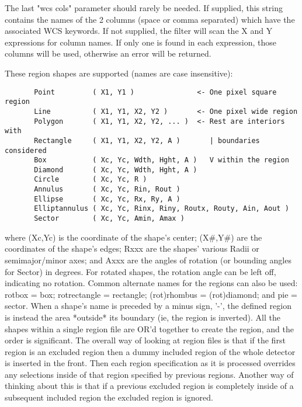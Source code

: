 \documentclass[11pt]{book}
\begin{document}
    The last "wcs cols" parameter should rarely be needed. If supplied,
    this  string contains the names of the 2 columns (space or comma
    separated) which have the associated WCS keywords. If not supplied,
    the filter  will scan the X  and Y expressions for column names.
    If only one is found in each  expression, those columns will be
    used, otherwise an error will be returned.

    These region shapes are supported (names are case insensitive):

\begin{verbatim}
       Point         ( X1, Y1 )               <- One pixel square region
       Line          ( X1, Y1, X2, Y2 )       <- One pixel wide region
       Polygon       ( X1, Y1, X2, Y2, ... )  <- Rest are interiors with
       Rectangle     ( X1, Y1, X2, Y2, A )       | boundaries considered
       Box           ( Xc, Yc, Wdth, Hght, A )   V within the region
       Diamond       ( Xc, Yc, Wdth, Hght, A )
       Circle        ( Xc, Yc, R )
       Annulus       ( Xc, Yc, Rin, Rout )
       Ellipse       ( Xc, Yc, Rx, Ry, A )
       Elliptannulus ( Xc, Yc, Rinx, Riny, Routx, Routy, Ain, Aout )
       Sector        ( Xc, Yc, Amin, Amax )
\end{verbatim}
    where (Xc,Yc) is  the coordinate of  the shape's center; (X\#,Y\#) are
    the coordinates  of the shape's edges;  Rxxx are the shapes' various
    Radii or semimajor/minor  axes; and Axxx  are the angles of rotation
    (or bounding angles for Sector) in degrees.  For rotated shapes, the
    rotation angle  can  be left  off, indicating  no rotation.   Common
    alternate  names for the regions  can also be  used: rotbox = box;
    rotrectangle = rectangle;  (rot)rhombus = (rot)diamond;  and pie
    = sector.  When a  shape's name is  preceded by a minus sign, '-',
    the defined region  is instead the area  *outside* its boundary (ie,
    the region is inverted).  All the shapes within a single region
    file are OR'd together to create the region, and the order is
    significant. The overall way of looking at region files is that if
    the first region is an excluded region then a dummy included region
    of the whole detector is inserted in the front. Then each region
    specification as it is processed overrides any selections inside of
    that region specified by previous regions. Another way of thinking
    about this is that if a previous excluded region is completely
    inside of a subsequent included region the excluded region is
    ignored.
\end{document}
